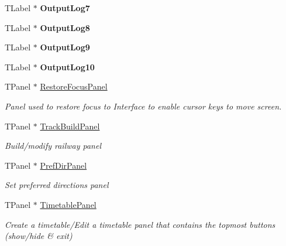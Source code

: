 \begin{DoxyCompactItemize}
T\+Label $\ast$ {\bfseries Output\+Log7}
\item 
\mbox{\label{class_t_interface_ae67f57427edf35cd3bb615c75a5b9790}} 
T\+Label $\ast$ {\bfseries Output\+Log8}
\item 
\mbox{\label{class_t_interface_a3f1cf2924a88667c4565f83a453adf93}} 
T\+Label $\ast$ {\bfseries Output\+Log9}
\item 
\mbox{\label{class_t_interface_ab945e5a071f603efbb7c2e04987ffba0}} 
T\+Label $\ast$ {\bfseries Output\+Log10}
\item 
\mbox{\label{class_t_interface_a292e63f2a8e9e2b4ca066056d3bd5870}} 
T\+Panel $\ast$ \mbox{\hyperlink{class_t_interface_a292e63f2a8e9e2b4ca066056d3bd5870}{Restore\+Focus\+Panel}}
\begin{DoxyCompactList}\small\item\em Panel used to restore focus to Interface to enable cursor keys to move screen. \end{DoxyCompactList}\item 
\mbox{\label{class_t_interface_a203c81dcf5ac3ae820cf17f6dfd21fff}} 
T\+Panel $\ast$ \mbox{\hyperlink{class_t_interface_a203c81dcf5ac3ae820cf17f6dfd21fff}{Track\+Build\+Panel}}
\begin{DoxyCompactList}\small\item\em \textquotesingle{}Build/modify railway\textquotesingle{} panel \end{DoxyCompactList}\item 
\mbox{\label{class_t_interface_a5fb96e72a347625f8fa80bc88144842d}} 
T\+Panel $\ast$ \mbox{\hyperlink{class_t_interface_a5fb96e72a347625f8fa80bc88144842d}{Pref\+Dir\+Panel}}
\begin{DoxyCompactList}\small\item\em \textquotesingle{}Set preferred directions\textquotesingle{} panel \end{DoxyCompactList}\item 
\mbox{\label{class_t_interface_aa0dce121f2c0feba11e8bda29cb16a97}} 
T\+Panel $\ast$ \mbox{\hyperlink{class_t_interface_aa0dce121f2c0feba11e8bda29cb16a97}{Timetable\+Panel}}
\begin{DoxyCompactList}\small\item\em \textquotesingle{}Create a timetable\textquotesingle{}/\textquotesingle{}Edit a timetable\textquotesingle{} panel that contains the topmost buttons (show/hide \& exit) \end{DoxyCompactList}\item 

\end{DoxyCompactItemize}
